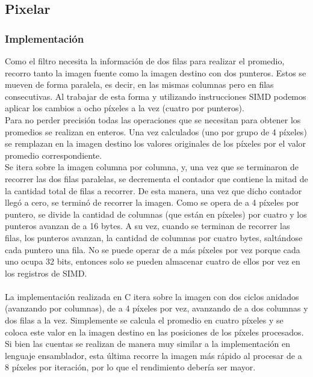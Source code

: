 \documentclass[a4paper]{article}
\begin{document}
\newpage

\subsection{Pixelar}
\subsubsection{Implementación}
Como el filtro necesita la información de dos filas para realizar el promedio, recorro tanto la imagen fuente como la imagen destino con dos punteros. Estos se mueven de forma paralela, es decir, en las mismas columnas pero en filas consecutivas. Al trabajar de esta forma y utilizando instrucciones SIMD podemos aplicar los cambios a ocho píxeles a la vez (cuatro por punteros).
\\Para no perder precisión todas las operaciones que se necesitan para obtener los promedios se realizan en enteros. Una vez calculados (uno por grupo de 4 píxeles) se remplazan en la imagen destino los valores originales de los píxeles por el valor promedio correspondiente.
\\Se itera sobre la imagen columna por columna, y, una vez que se terminaron de recorrer las dos filas paralelas, se decrementa el contador que contiene la mitad de la cantidad total de filas a recorrer. De esta manera, una vez que dicho contador llegó a cero, se terminó de recorrer la imagen. Como se opera de a 4 píxeles por puntero, se divide la cantidad de columnas (que están en píxeles) por cuatro y los punteros avanzan de a 16 bytes. A su vez, cuando se terminan de recorrer las filas, los punteros avanzan, la cantidad de columnas por cuatro bytes, saltándose cada puntero una fila. No se puede operar de a más píxeles por vez porque cada uno ocupa 32 bits, entonces solo se pueden almacenar cuatro de ellos por vez en los registros de SIMD.
\\
\\
La implementación realizada en C itera sobre la imagen con dos ciclos anidados (avanzando por columnas), de a 4 píxeles por vez, avanzando de a dos columnas y dos filas a la vez. Simplemente se calcula el promedio en cuatro píxeles y se coloca este valor en la imagen destino en las posiciones de los píxeles procesados. Si bien las cuentas se realizan de manera muy similar a la implementación en lenguaje ensamblador, esta última recorre la imagen más rápido al procesar de a 8 píxeles por iteración, por lo que el rendimiento debería ser mayor.


\newpage
\end{document}
